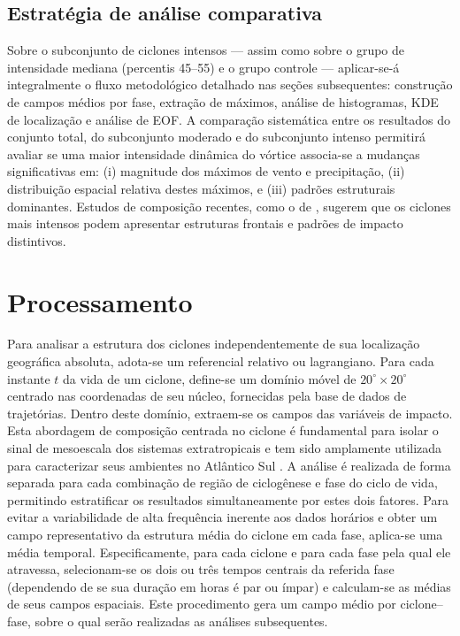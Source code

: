 

\subsection{Estratégia de análise comparativa}\label{subsec:estrategia_analise}
Sobre o subconjunto de ciclones intensos — assim como sobre o grupo de intensidade mediana (percentis 45--55) e o grupo controle — aplicar-se-á integralmente o fluxo metodológico detalhado nas seções subsequentes: construção de campos médios por fase, extração de máximos, análise de histogramas, KDE de localização e análise de EOF. A comparação sistemática entre os resultados do conjunto total, do subconjunto moderado e do subconjunto intenso permitirá avaliar se uma maior intensidade dinâmica do vórtice associa-se a mudanças significativas em: (i) magnitude dos máximos de vento e precipitação, (ii) distribuição espacial relativa destes máximos, e (iii) padrões estruturais dominantes. Estudos de composição recentes, como o de \citet{andrade2024composite}, sugerem que os ciclones mais intensos podem apresentar estruturas frontais e padrões de impacto distintivos.


\section{Processamento}\label{sec:procesamiento_lagrangiano}

Para analisar a estrutura dos ciclones independentemente de sua localização geográfica absoluta, adota-se um referencial relativo ou lagrangiano. Para cada instante $t$ da vida de um ciclone, define-se um domínio móvel de $20^{\circ} \times 20^{\circ}$ centrado nas coordenadas de seu núcleo, fornecidas pela base de dados de trajetórias. Dentro deste domínio, extraem-se os campos das variáveis de impacto. Esta abordagem de composição centrada no ciclone é fundamental para isolar o sinal de mesoescala dos sistemas extratropicais e tem sido amplamente utilizada para caracterizar seus ambientes no Atlântico Sul \citep{crespo2020potential, priestley2022improved}. 
A análise é realizada de forma separada para cada combinação de região de ciclogênese e fase do ciclo de vida, permitindo estratificar os resultados simultaneamente por estes dois fatores. Para evitar a variabilidade de alta frequência inerente aos dados horários e obter um campo representativo da estrutura média do ciclone em cada fase, aplica-se uma média temporal. Especificamente, para cada ciclone e para cada fase pela qual ele atravessa, selecionam-se os dois ou três tempos centrais da referida fase (dependendo de se sua duração em horas é par ou ímpar) e calculam-se as médias de seus campos espaciais. Este procedimento gera um campo médio por ciclone--fase, sobre o qual serão realizadas as análises subsequentes.

